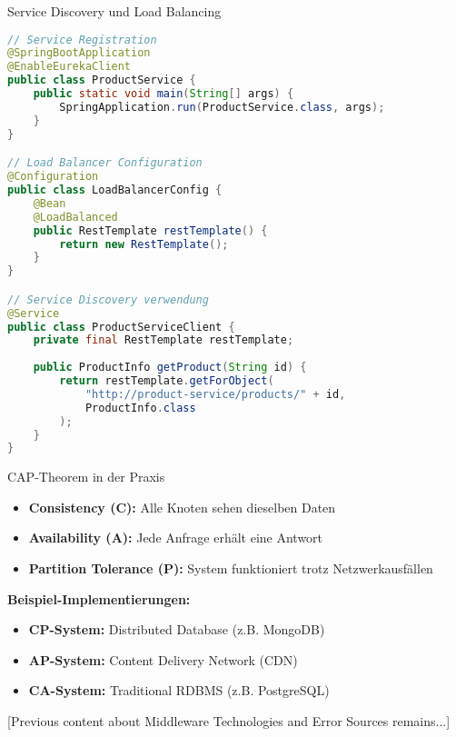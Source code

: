 \begin{KR}{Service Discovery und Load Balancing}
\begin{lstlisting}[language=Java]
// Service Registration
@SpringBootApplication
@EnableEurekaClient
public class ProductService {
    public static void main(String[] args) {
        SpringApplication.run(ProductService.class, args);
    }
}

// Load Balancer Configuration
@Configuration
public class LoadBalancerConfig {
    @Bean
    @LoadBalanced
    public RestTemplate restTemplate() {
        return new RestTemplate();
    }
}

// Service Discovery verwendung
@Service
public class ProductServiceClient {
    private final RestTemplate restTemplate;
    
    public ProductInfo getProduct(String id) {
        return restTemplate.getForObject(
            "http://product-service/products/" + id,
            ProductInfo.class
        );
    }
}
\end{lstlisting}
\end{KR}

\begin{concept}{CAP-Theorem in der Praxis}
\begin{itemize}
    \item \textbf{Consistency (C):} Alle Knoten sehen dieselben Daten
    \item \textbf{Availability (A):} Jede Anfrage erhält eine Antwort
    \item \textbf{Partition Tolerance (P):} System funktioniert trotz Netzwerkausfällen
\end{itemize}

\textbf{Beispiel-Implementierungen:}
\begin{itemize}
    \item \textbf{CP-System:} Distributed Database (z.B. MongoDB)
    \item \textbf{AP-System:} Content Delivery Network (CDN)
    \item \textbf{CA-System:} Traditional RDBMS (z.B. PostgreSQL)
\end{itemize}
\end{concept}

[Previous content about Middleware Technologies and Error Sources remains...]